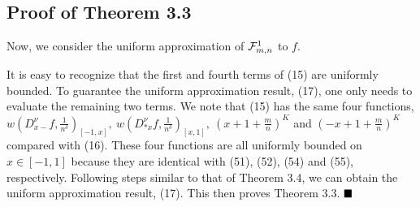 \documentclass[journal]{IEEEtran}
\begin{document}
{\subsection{{\color{black}Proof of Theorem 3.3}}

Now, we {\color{black} consider} the uniform approximation of $\mathcal{F}_{m,n}^{{\color{black}1}}$ to $f$.

It is easy to {\color{black} recognize} that the first and fourth terms of (15) are uniformly bounded. To guarantee the uniform approximation result, (17), one only needs to evaluate the remaining two terms. We note that (15) has the same four  functions,
 $w(D_{x-}^{\nu}f,\frac{1}{n^{\delta}})_{[-1,x]},~w(D_{*x}^{\nu}f,\frac{1}{n^{\delta}})_{[x,1]},~
(x+1+\frac{m}{n})^{K}$ and $(-x+1+\frac{m}{n})^{K}$ compared with (16). These four functions are all uniformly bounded on $x\in[-1,1]$ because they are identical {\color{black} with  (51), (52), (54)  and (55), respectively}. Following steps similar to that of Theorem {\color{black}3.4}, we can obtain the uniform approximation result, (17). This then  {\color{black} proves} Theorem  {\color{black}3.3}.  
$\hfill\blacksquare$ 
}
\end{document}
